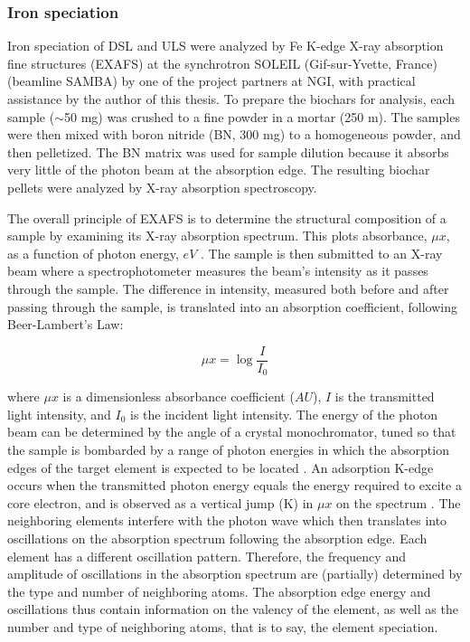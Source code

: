 \subsubsection{Iron speciation}
Iron speciation of DSL and ULS were analyzed by Fe K-edge X-ray absorption fine structures (EXAFS) at the synchrotron SOLEIL (Gif-sur-Yvette, France) (beamline SAMBA) by one of the project partners at NGI, with practical assistance by the author of this thesis. To prepare the biochars for analysis, each sample ($\sim$50 mg) was crushed to a fine powder in a mortar (250 \textmu m). The samples were then mixed with boron nitride (BN, 300 mg) to a homogeneous powder, and then pelletized. The BN matrix was used for sample dilution because it absorbs very little of the photon beam at the absorption edge. The resulting biochar pellets were analyzed by X-ray absorption spectroscopy.

The overall principle of EXAFS is to determine the structural composition of a sample by examining its X-ray absorption spectrum. This plots absorbance, $\mu x$, as a function of photon energy, $eV$ \citep{vlaica2004exafs}. The sample is then submitted to an X-ray beam where a spectrophotometer measures the beam's intensity as it passes through the sample. The difference in intensity, measured both before and after passing through the sample, is translated into an absorption coefficient, following Beer-Lambert's Law: 

\begin{equation}\label{eq:absorbance}
    \mu x = \log \frac{I}{I_0}
\end{equation}

where $\mu x$ is a dimensionless absorbance coefficient ($AU$), $I$ is the transmitted light intensity, and $I_0$ is the incident light intensity. The energy of the photon beam can be determined by the angle of a crystal monochromator, tuned so that the sample is bombarded by a range of photon energies in which the absorption edges of the target element is expected to be located \citep{vlaica2004exafs}. An adsorption K-edge occurs when the transmitted photon energy equals the energy required to excite a core electron, and is observed as a vertical jump (K) in $\mu x$ on the spectrum \citep{vlaica2004exafs}. The neighboring elements interfere with the photon wave which then translates into oscillations on the absorption spectrum following the absorption edge. Each element has a different oscillation pattern. Therefore, the frequency and amplitude of oscillations in the absorption spectrum are (partially) determined by the type and number of neighboring atoms. The absorption edge energy and oscillations thus contain information on the valency of the element, as well as the number and type of neighboring atoms, that is to say, the element speciation.


